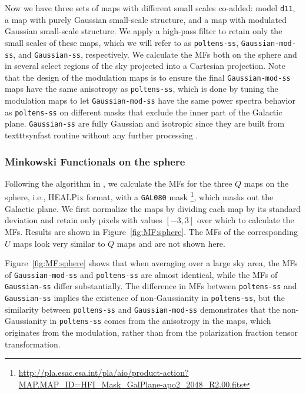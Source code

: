 \documentclass[twocolumn]{aastex631}
\newcommand{\deleven}{{\tt d11}}
\begin{document}
Now we have three sets of maps with different small scales co-added: model \deleven, a map with purely Gaussian small-scale structure, and a map with modulated Gaussian small-scale structure. %
We apply a high-pass filter to retain only the small scales of these maps, which we will refer to as \texttt{poltens-ss}, \texttt{Gaussian-mod-ss}, and \texttt{Gaussian-ss}, respectively. We calculate the MFs both on the sphere and in several select regions of the sky projected into a Cartesian projection. Note that the design of the modulation maps is to ensure the final \texttt{Gaussian-mod-ss} maps have the same anisotropy as \texttt{poltens-ss}, which is done by tuning the modulation maps to let \texttt{Gaussian-mod-ss} have the same power spectra behavior as \texttt{poltens-ss} on different masks that exclude the inner part of the Galactic plane. \texttt{Gaussian-ss} are fully Gaussian and isotropic since they are built from texttt{synfast} routine without any further processing . 


\subsubsection{Minkowski Functionals on the sphere}

Following the algorithm in \cite{Grewal:2022}, we calculate the MFs for the three $Q$ maps on the sphere, i.e., HEALPix format, with a \texttt{GAL080} mask \footnote{\url{http://pla.esac.esa.int/pla/aio/product-action?MAP.MAP_ID=HFI_Mask_GalPlane-apo2_2048_R2.00.fits}}, which masks out the Galactic plane. We first normalize the maps by dividing each map by its standard deviation and retain only pixels with values $[-3, 3]$ over which to calculate the MFs. Results are shown in Figure~\ref{fig:MF:sphere}. The MFs of the corresponding $U$ maps look very similar to $Q$ maps and are not shown here.

Figure~\ref{fig:MF:sphere} shows that when averaging over a large sky area, the MFs of \texttt{Gaussian-mod-ss} and \texttt{poltens-ss} are almost identical, while the MFs of \texttt{Gaussian-ss} differ substantially. The difference in MFs between \texttt{poltens-ss} and \texttt{Gaussian-ss} implies the existence of non-Gaussianity in \texttt{poltens-ss}, but the similarity between \texttt{poltens-ss} and \texttt{Gaussian-mod-ss} demonstrates that the non-Gaussianity in \texttt{poltens-ss} comes from the anisotropy in the maps, which originates from the modulation, rather than from the polarization fraction tensor transformation.
\end{document}
